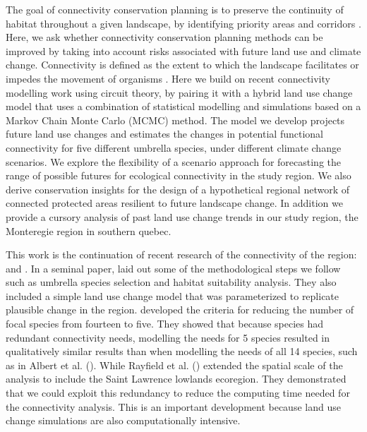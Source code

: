 The goal of connectivity conservation planning is to preserve the continuity of habitat throughout a given landscape, by identifying priority areas and corridors \citep{keeley_thirty_2019}. Here, we ask whether connectivity conservation planning methods can be improved by taking into account risks associated with future land use and climate change. Connectivity is defined as the extent to which the landscape facilitates or impedes the movement of organisms \citep{crooks_landscape_2006}. Here we build on recent connectivity modelling work using circuit theory, by pairing it with a hybrid land use change model that uses a combination of statistical modelling and simulations based on a Markov Chain Monte Carlo (MCMC) method. The model we develop projects future land use changes and estimates the changes in potential functional connectivity for five different umbrella species, under different climate change scenarios. We explore the flexibility of a scenario approach for forecasting the range of possible futures for ecological connectivity in the study region. We also derive conservation insights for the design of a hypothetical regional network of connected protected areas resilient to future landscape change. In addition we provide a cursory analysis of past land use change trends in our study region, the Monteregie region in southern quebec. 

This work is the continuation of recent research  of the connectivity of the region: \cite{albert_applying_2017} and \citep{rayfield_priorisation_2018}. In a seminal paper, \cite{albert_applying_2017} laid out some of the methodological steps we follow such as umbrella species selection and habitat suitability analysis. They also included a simple land use change model that was parameterized to replicate plausible change in the region. \cite{meurant_selecting_2018} developed the criteria for reducing the number of focal species from fourteen to five. They showed that because species had redundant connectivity needs, modelling the needs for 5 species resulted in qualitatively similar results than when modelling the needs of all 14 species, such as in Albert et al. (\citeyear{albert_applying_2017}). While Rayfield et al. (\citeyear{rayfield_priorisation_2018}) extended the spatial scale of the analysis to include the Saint Lawrence lowlands ecoregion. They demonstrated that we could exploit this redundancy to reduce the computing time needed for the connectivity analysis. This is an important development because land use change simulations are also computationally intensive. \\

